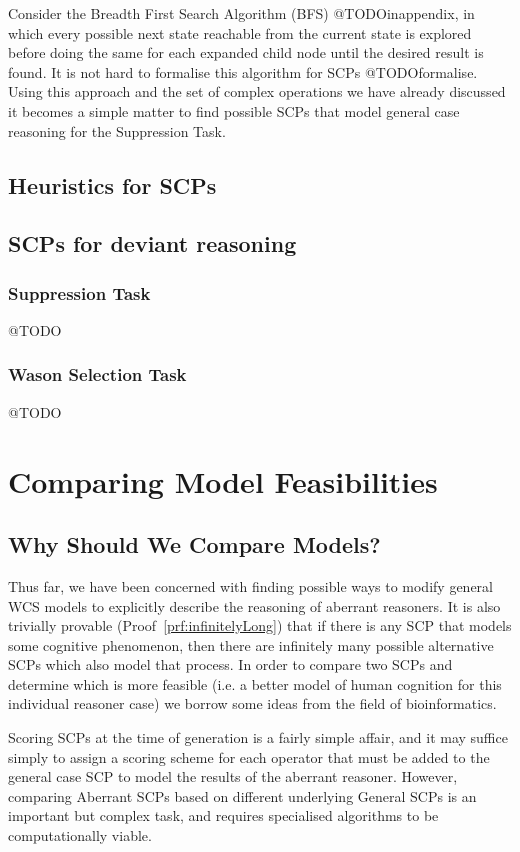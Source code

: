 \documentclass{article}
\begin{document}
Consider the Breadth First Search Algorithm (BFS) @TODOinappendix, in which every possible next state reachable from the current state is explored before doing the same for each expanded child node until the desired result is found. It is not hard to formalise this algorithm for SCPs @TODOformalise. Using this approach and the set of complex operations we have already discussed it becomes a simple matter to find possible SCPs that model general case reasoning for the Suppression Task.

\subsection{Heuristics for SCPs}


\subsection*{SCPs for deviant reasoning}


\subsubsection*{Suppression Task}
@TODO

\subsubsection*{Wason Selection Task}
@TODO

\section{Comparing Model Feasibilities} \label{sec:comp}

\subsection{Why Should We Compare Models?}
Thus far, we have been concerned with finding possible ways to modify general WCS models to explicitly describe the reasoning of aberrant reasoners. It is also trivially provable (Proof~\ref{prf:infinitelyLong}) that if there is any SCP that models some cognitive phenomenon, then there are infinitely many possible alternative SCPs which also model that process. In order to compare two SCPs and determine which is more feasible (i.e. a better model of human cognition for this individual reasoner case) we borrow some ideas from the field of bioinformatics.

Scoring SCPs at the time of generation is a fairly simple affair, and it may suffice simply to assign a scoring scheme for each operator that must be added to the general case SCP to model the results of the aberrant reasoner. However, comparing Aberrant SCPs based on different underlying General SCPs is an important but complex task, and requires specialised algorithms to be computationally viable.
\end{document}
